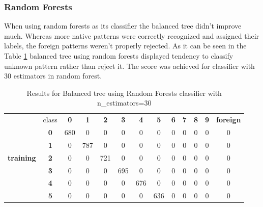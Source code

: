 \subsubsection{Random Forests}

When using random forests as its classifier the balanced tree didn't improve much. Whereas more native patterns were correctly recognized and assigned their labels, the foreign patterns weren't properly rejected. As it can be seen in the Table \ref{balanced_tree_rf_results} balanced tree using random forests displayed tendency to classify unknown pattern rather than reject it. The score was achieved for classifier with 30 estimators in random forest.

\begin{table}[htp]
	\centering
	\caption{Results for Balanced tree using Random Forests classifier with n\_estimators=30}
	\label{balanced_tree_rf_results}
	\begin{tabular}{|c|c|c|c|c|c|c|c|c|c|c|c|c|}
		\hline
		\multirow{11}{*}{\textbf{training}} & class      & \textbf{0} & \textbf{1} & \textbf{2} & \textbf{3} & \textbf{4} & \textbf{5} & \textbf{6} & \textbf{7} & \textbf{8} & \textbf{9} & \textbf{foreign} \\ \cline{2-13} 
		& \textbf{0} & 680        & 0          & 0          & 0          & 0          & 0          & 0          & 0          & 0          & 0          & 0                \\ \cline{2-13} 
		& \textbf{1} & 0          & 787        & 0          & 0          & 0          & 0          & 0          & 0          & 0          & 0          & 0                \\ \cline{2-13} 
		& \textbf{2} & 0          & 0          & 721        & 0          & 0          & 0          & 0          & 0          & 0          & 0          & 0                \\ \cline{2-13} 
		& \textbf{3} & 0          & 0          & 0          & 695        & 0          & 0          & 0          & 0          & 0          & 0          & 0                \\ \cline{2-13} 
		& \textbf{4} & 0          & 0          & 0          & 0          & 676        & 0          & 0          & 0          & 0          & 0          & 0                \\ \cline{2-13} 
		& \textbf{5} & 0          & 0          & 0          & 0          & 0          & 636        & 0          & 0          & 0          & 0          & 0                \\ \cline{2-13} 

\end{tabular}
\end{table}
